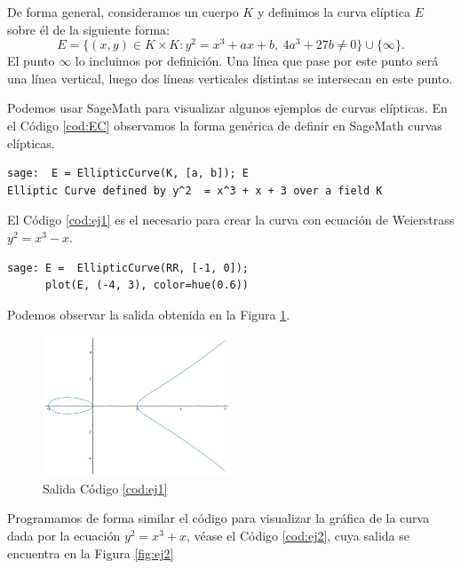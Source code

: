 \documentclass[11pt]{article}
\begin{document}
De forma general, consideramos un cuerpo $K$ y definimos la curva elíptica $E$ sobre él de la siguiente forma:
\[E = \{(x,y) \in K\times K : y^2 = x^3 + ax +b,\ 4a^3+27b \neq 0\} \cup \{\infty\}.
\]
El punto $\infty$ lo incluimos por definición. Una línea que pase por este punto será una línea vertical, luego dos líneas verticales distintas se intersecan en este punto.

Podemos usar SageMath para visualizar algunos ejemplos de curvas elípticas. En el Código \ref{cod:EC} observamos la forma genérica de definir en SageMath curvas elípticas.

\begin{lstlisting}[label={cod:EC}, caption={Curva elíptica en Sage}, morekeywords={sage}]
sage:  E = EllipticCurve(K, [a, b]); E
Elliptic Curve defined by y^2  = x^3 + x + 3 over a field K
\end{lstlisting}

El Código \ref{cod:ej1} es el necesario para crear la curva con ecuación de Weierstrass $y^2=x^3-x$.

\begin{lstlisting}[label={cod:ej1}, caption={Curva elíptica $y^2=x^3-x$}, morekeywords={sage}]
sage: E =  EllipticCurve(RR, [-1, 0]);
      plot(E, (-4, 3), color=hue(0.6))
\end{lstlisting}

Podemos observar la salida obtenida en la Figura \ref{fig:ej1}.

\begin{figure}[H]
    \centering
    \includegraphics[width=0.5\textwidth]{ej1}
    \caption{Salida Código \ref{cod:ej1}}
    \label{fig:ej1}
\end{figure}

Programamos de forma similar el código para visualizar la gráfica de la curva dada por la ecuación $y^2=x^3+x$, véase el Código \ref{cod:ej2}, cuya salida se encuentra en la Figura \ref{fig:ej2}
\end{document}
